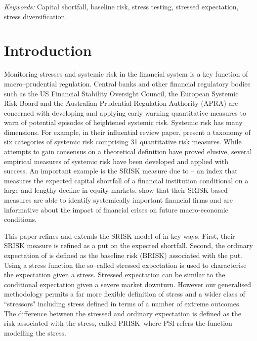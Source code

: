 \documentclass[12pt]{article}
\newcommand{\br}{\ensuremath{\mathrm{BRISK}}}
\newcommand{\pr}{\ensuremath{\mathrm{PRISK}}}
\begin{document}
\noindent%
{\it Keywords:}  Capital shortfall, baseline risk, stress testing,  stressed expectation, stress diversification.
\vfill

\newpage
{} %

\section{Introduction}\label{intro}
Monitoring stresses and systemic risk in the financial system is a key function of macro--prudential regulation. Central banks and other financial regulatory bodies such as the US Financial Stability Oversight Council, the European Systemic Risk Board and the Australian Prudential Regulation Authority (APRA) are concerned with developing and applying early warning quantitative  measures  to warn of potential episodes of heightened systemic risk. Systemic risk has many dimensions. For example, in their influential review paper, \cite{Bisias2012} present a taxonomy of six categories of systemic risk comprising 31 quantitative risk measures. While attempts to gain consensus on a theoretical definition have proved elusive, several empirical measures of systemic risk have been developed and applied with  success.  An important example is the SRISK measure due to \cite{brownlees2015} -- an index that measures the expected capital shortfall of a financial institution conditional on a large and lengthy decline in equity markets. \cite{brownlees2015} show that their SRISK based measures are able to identify systemically important financial firms and are informative about the impact of financial crises on future macro-economic conditions. 

This paper refines and extends the SRISK model of \cite{brownlees2015} in  key ways. First, their SRISK measure is refined  as a put on the expected shortfall.   Second, the ordinary expectation of is defined as the baseline risk (\br) associated with the put.   Using a stress function  the so--called stressed expectation is used to characterise the expectation given a stress.   Stressed expectation can be similar to the \cite{brownlees2015} conditional expectation given  a severe market downturn.  However our generalised methodology  permits a far more flexible definition of stress and a wider class of ``stressors" including stress defined in terms of  a number of extreme outcomes.  The difference between the stressed and ordinary expectation is defined as the risk associated with the stress, called \pr\ where PSI refers the function modelling the stress. 
\end{document}
